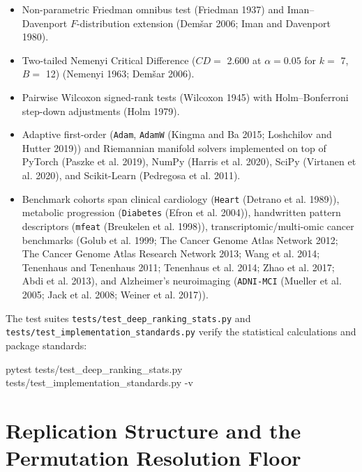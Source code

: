 \documentclass[
  10pt,
  letterpaper,
]{report}
\newenvironment{Shaded}{\begin{snugshade}}{\end{snugshade}}
\newcommand{\AttributeTok}[1]{\textcolor[rgb]{0.40,0.45,0.13}{#1}}
\newcommand{\ExtensionTok}[1]{\textcolor[rgb]{0.00,0.23,0.31}{#1}}
\newcommand{\NormalTok}[1]{\textcolor[rgb]{0.00,0.23,0.31}{#1}}
\providecommand{\tightlist}{%
  \setlength{\itemsep}{0pt}\setlength{\parskip}{0pt}}
\begin{document}
\begin{itemize}
\tightlist
\item
  Non-parametric Friedman omnibus test (Friedman 1937) and
  Iman--Davenport \(F\)-distribution extension (Demšar 2006; Iman and
  Davenport 1980).
\item
  Two-tailed Nemenyi Critical Difference (\(CD =\) 2.600 at
  \(\alpha = 0.05\) for \(k =\) 7, \(B =\) 12) (Nemenyi 1963; Demšar
  2006).
\item
  Pairwise Wilcoxon signed-rank tests (Wilcoxon 1945) with
  Holm--Bonferroni step-down adjustments (Holm 1979).
\item
  Adaptive first-order (\texttt{Adam}, \texttt{AdamW} (Kingma and Ba
  2015; Loshchilov and Hutter 2019)) and Riemannian manifold solvers
  implemented on top of PyTorch ({Paszke et al.} 2019), NumPy ({Harris
  et al.} 2020), SciPy ({Virtanen et al.} 2020), and Scikit-Learn
  ({Pedregosa et al.} 2011).
\item
  Benchmark cohorts span clinical cardiology (\texttt{Heart} (Detrano et
  al. 1989)), metabolic progression (\texttt{Diabetes} (Efron et al.
  2004)), handwritten pattern descriptors (\texttt{mfeat} (Breukelen et
  al. 1998)), transcriptomic/multi-omic cancer benchmarks ({Golub et
  al.} 1999; The Cancer Genome Atlas Network 2012; The Cancer Genome
  Atlas Research Network 2013; Wang et al. 2014; Tenenhaus and Tenenhaus
  2011; Tenenhaus et al. 2014; Zhao et al. 2017; Abdi et al. 2013), and
  Alzheimer's neuroimaging (\texttt{ADNI-MCI} (Mueller et al. 2005;
  {Jack et al.} 2008; {Weiner et al.} 2017)).
\end{itemize}

The test suites \texttt{tests/test\_deep\_ranking\_stats.py} and
\texttt{tests/test\_implementation\_standards.py} verify the statistical
calculations and package standards:

\begin{Shaded}
\begin{Highlighting}[]
\ExtensionTok{pytest}\NormalTok{ tests/test\_deep\_ranking\_stats.py tests/test\_implementation\_standards.py }\AttributeTok{{-}v}
\end{Highlighting}
\end{Shaded}

\section{Replication Structure and the Permutation Resolution
Floor}\label{replication-structure-and-the-permutation-resolution-floor}
\end{document}
